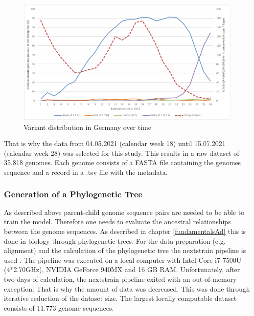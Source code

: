\begin{figure}[ht]
	\centering
	\includegraphics[width=1.0\linewidth]{figures/rkiVariantDistribution.png}
	\caption{Variant distribution in Germany over time \cite{robertkochinstituteditorBerichtVirusvariantenSARSCoV22021}}
	\label{rkiVariantDistribution}
\end{figure}

That is why the data from 04.05.2021 (calendar week 18) until 15.07.2021 (calendar week 28) was selected for this study. This results in a raw dataset of 35.818 genomes. Each genome consists of a FASTA file containing the genomes sequence and a record in a .tsv file with the metadata.


\subsubsection{Generation of a Phylogenetic Tree} \label{approachAb}

As described above parent-child genome sequence pairs are needed to be able to train the model. Therefore one needs to evaluate the ancestral relationships between the genome sequences. As described in chapter \ref{fundamentalsAd} this is done in biology through phylogenetic trees. For the data preparation (e.g. alignment) and the calculation of the phylogenetic tree the nextstrain pipeline is used \cite{10.1093/bioinformatics/bty407}. The pipeline was executed on a local computer with Intel Core i7-7500U (4*2.70GHz), NVIDIA GeForce 940MX and 16 GB RAM. Unfortunately, after two days of calculation, the nextstrain pipeline exited with an out-of-memory exception. That is why the amount of data was decreased. This was done through iterative reduction of the dataset size. The largest locally computable dataset consists of 11.773 genome sequences.


